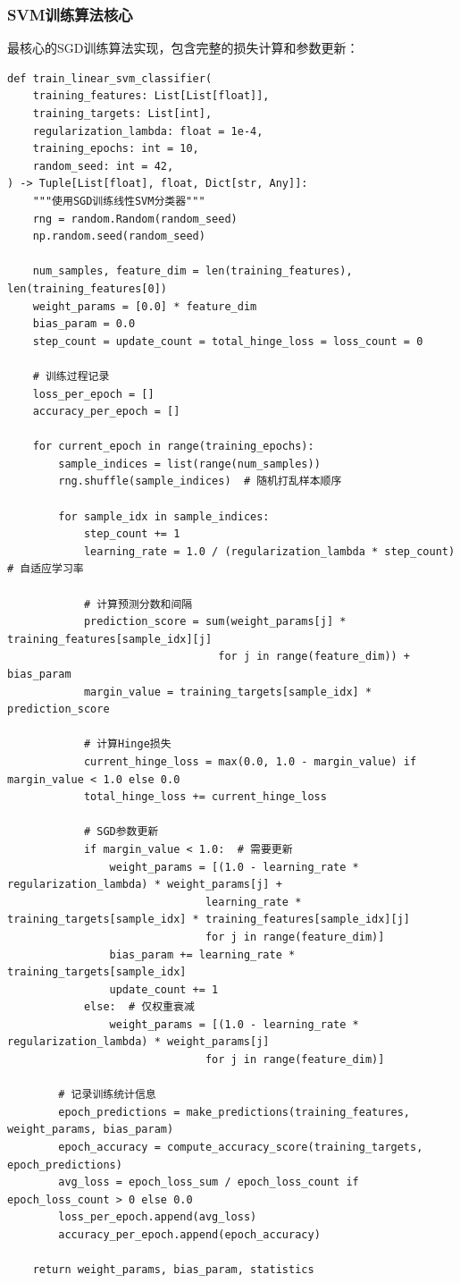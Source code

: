 \documentclass[a4paper]{article}
\begin{document}
\subsubsection{SVM训练算法核心}
最核心的SGD训练算法实现，包含完整的损失计算和参数更新：

\begin{lstlisting}[caption=SVM SGD训练核心算法]
def train_linear_svm_classifier(
    training_features: List[List[float]],
    training_targets: List[int],
    regularization_lambda: float = 1e-4,
    training_epochs: int = 10,
    random_seed: int = 42,
) -> Tuple[List[float], float, Dict[str, Any]]:
    """使用SGD训练线性SVM分类器"""
    rng = random.Random(random_seed)
    np.random.seed(random_seed)

    num_samples, feature_dim = len(training_features), len(training_features[0])
    weight_params = [0.0] * feature_dim
    bias_param = 0.0
    step_count = update_count = total_hinge_loss = loss_count = 0

    # 训练过程记录
    loss_per_epoch = []
    accuracy_per_epoch = []

    for current_epoch in range(training_epochs):
        sample_indices = list(range(num_samples))
        rng.shuffle(sample_indices)  # 随机打乱样本顺序

        for sample_idx in sample_indices:
            step_count += 1
            learning_rate = 1.0 / (regularization_lambda * step_count)  # 自适应学习率

            # 计算预测分数和间隔
            prediction_score = sum(weight_params[j] * training_features[sample_idx][j] 
                                 for j in range(feature_dim)) + bias_param
            margin_value = training_targets[sample_idx] * prediction_score

            # 计算Hinge损失
            current_hinge_loss = max(0.0, 1.0 - margin_value) if margin_value < 1.0 else 0.0
            total_hinge_loss += current_hinge_loss

            # SGD参数更新
            if margin_value < 1.0:  # 需要更新
                weight_params = [(1.0 - learning_rate * regularization_lambda) * weight_params[j] + 
                               learning_rate * training_targets[sample_idx] * training_features[sample_idx][j] 
                               for j in range(feature_dim)]
                bias_param += learning_rate * training_targets[sample_idx]
                update_count += 1
            else:  # 仅权重衰减
                weight_params = [(1.0 - learning_rate * regularization_lambda) * weight_params[j] 
                               for j in range(feature_dim)]

        # 记录训练统计信息
        epoch_predictions = make_predictions(training_features, weight_params, bias_param)
        epoch_accuracy = compute_accuracy_score(training_targets, epoch_predictions)
        avg_loss = epoch_loss_sum / epoch_loss_count if epoch_loss_count > 0 else 0.0
        loss_per_epoch.append(avg_loss)
        accuracy_per_epoch.append(epoch_accuracy)

    return weight_params, bias_param, statistics
\end{lstlisting}
\end{document}
